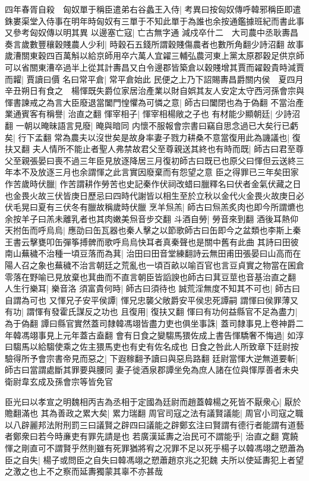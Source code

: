 四年春胥自殺　匈奴單于稱臣遣弟右谷蠡王入侍|{
	考異曰按匈奴傳呼韓邪稱臣即遣銖婁渠堂入侍事在明年時匈奴有三單于不知此單于為誰也余按通鑑據班紀而書此事又參考匈奴傳以明其異}
以邊塞亡寇|{
	亡古無字通}
減戍卒什二　大司農中丞耿夀昌奏言歲數豐穰穀賤農人少利|{
	時穀石五錢所謂穀賤傷農者也數所角翻少詩沼翻}
故事歲漕關東穀四百萬斛以給京師用卒六萬人宜糴三輔弘農河東上黨太原郡穀足供京師可以省關東漕卒過半上從其計夀昌又白令邊郡皆築倉以穀賤增其賈而糴穀貴時減賈而糶|{
	賈讀曰價}
名曰常平倉|{
	常平倉始此}
民便之上乃下詔賜夀昌爵關内侯　夏四月辛丑朔日有食之　楊惲既失爵位家居治產業以財自娯其友人安定太守西河孫會宗與惲書諫戒之為言大臣廢退當闔門惶懼為可憐之意|{
	師古曰闔閉也為于偽翻}
不當治產業通賓客有稱譽|{
	治直之翻}
惲宰相子|{
	惲宰相楊敞之子也}
有材能少顯朝廷|{
	少詩沼翻}
一朝以晻昧語言見廢|{
	晻與暗同}
内懷不服報會宗書曰竊自思念過已大矣行已虧矣|{
	行下孟翻}
常為農夫以沒世矣是故身率妻子戮力耕桑不意當復用此為譏議也|{
	復扶又翻}
夫人情所不能止者聖人弗禁故君父至尊親送其終也有時而既|{
	師古曰君至尊父至親張晏曰喪不過三年臣見放逐降居三月復初師古曰既已也原父曰惲但云送終三年本不及放逐三月也余謂惲之此言實因廢棄而有怨望之意}
臣之得罪已三年矣田家作苦歲時伏臘|{
	作苦謂耕作勞苦也史記秦作伏祠改蜡曰臘釋名曰伏者金氣伏藏之日也金畏火故三伏皆庚日歷忌曰四時代謝皆以相生至於立秋以金代火金畏火故庚日必伏毛晃曰夏有三伏冬有臘故稱歲時伏臘}
烹羊炰羔|{
	師古曰炰羔炙肉也即今所謂爊也余按羊子曰羔未離乳者也其肉嫩美炰音步交翻}
斗酒自勞|{
	勞音來到翻}
酒後耳熱仰天拊缶而呼烏烏|{
	應劭曰缶瓦器也秦人擊之以節歌師古曰缶即今之盆類也李斯上秦王書云擊甕叩缶彈筝搏髀而歌呼烏烏快耳者真秦聲也是關中舊有此曲}
其詩曰田彼南山蕪穢不治種一頃豆落而為萁|{
	治田曰田音堂練翻詩云無田甫田張晏曰山高而在陽人召之象也蕪穢不治言朝廷之荒亂也一頃百畝以喻百官也言豆貞實之物當在囷倉零落在野喻已見放棄也萁曲而不直言朝臣皆謟諛也師古曰萁豆莖也音基治直之翻}
人生行樂耳|{
	樂音洛}
須富貴何時|{
	師古曰須待也}
誠荒淫無度不知其不可也|{
	師古曰自謂為可也}
又惲兄子安平侯譚|{
	惲兄忠襲父敞爵安平侯忠死譚嗣}
謂惲曰侯罪薄又有功|{
	謂惲有發霍氏謀反之功也}
且復用|{
	復扶又翻}
惲曰有功何益縣官不足為盡力|{
	為于偽翻}
譚曰縣官實然蓋司隸韓馮翊皆盡力吏也俱坐事誅|{
	蓋司隸事見上卷神爵二年韓馮翊事見上元年蓋古盍翻}
會有日食之變騶馬猥佐成上書告惲驕奢不悔過|{
	如淳曰騶馬以給騶使乘之佐主猥馬吏也有史有佐名成也}
日食之咎此人所致章下廷尉按驗得所予會宗書帝見而惡之|{
	下遐稼翻予讀曰與惡烏路翻}
廷尉當惲大逆無道要斬|{
	師古曰當謂處斷其罪要與腰同}
妻子徙酒泉郡譚坐免為庶人諸在位與惲厚善者未央衛尉韋玄成及孫會宗等皆免官

臣光曰以孝宣之明魏相丙吉為丞相于定國為廷尉而趙蓋韓楊之死皆不厭衆心|{
	厭於贍翻滿也}
其為善政之累大矣|{
	累力瑞翻}
周官司寇之法有議賢議能|{
	周官小司寇之職以八辟麗邦法附刑罰三曰議賢之辟四曰議能之辟鄭玄注曰賢謂有德行者能謂有道藝者鄭衆曰若今時亷吏有罪先請是也}
若廣漢延夀之治民可不謂能乎|{
	治直之翻}
寛饒惲之剛直可不謂賢乎然則雖有死罪猶將宥之况罪不足以死乎楊子以韓馮翊之愬蕭為臣之自失|{
	楊子或問臣之自失曰韓馮翊之愬蕭趙京兆之犯魏}
夫所以使延夀犯上者望之激之也上不之察而延夀獨蒙其辜不亦甚哉


